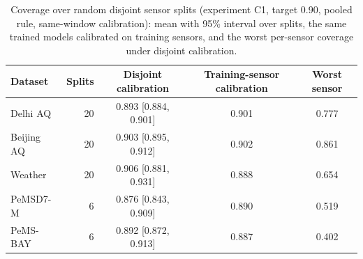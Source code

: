 \begin{table}[htbp]
\caption{Coverage over random disjoint sensor splits (experiment C1, target 0.90, pooled rule, same-window calibration): mean with 95\% interval over splits, the same trained models calibrated on training sensors, and the worst per-sensor coverage under disjoint calibration.}
\label{tab:legacyfull}
\centering\small
\begin{tabular}{lrccc}
\toprule
\textbf{Dataset} & \textbf{Splits} & \textbf{Disjoint calibration} & \textbf{Training-sensor calibration} & \textbf{Worst sensor} \\
\midrule
Delhi AQ & 20 & 0.893 [0.884, 0.901] & 0.901 & 0.777 \\
Beijing AQ & 20 & 0.903 [0.895, 0.912] & 0.902 & 0.861 \\
Weather & 20 & 0.906 [0.881, 0.931] & 0.888 & 0.654 \\
PeMSD7-M & 6 & 0.876 [0.843, 0.909] & 0.890 & 0.519 \\
PeMS-BAY & 6 & 0.892 [0.872, 0.913] & 0.887 & 0.402 \\
\bottomrule
\end{tabular}
\end{table}

